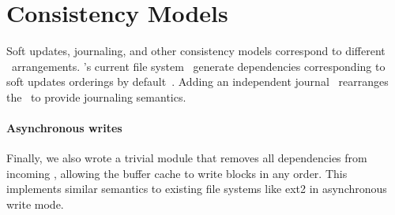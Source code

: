 \section{Consistency Models}
\label{sec:using}

Soft updates, journaling, and other consistency models
correspond to different \patch\ arrangements.
%
\Kudos's current file system \modules\ generate dependencies corresponding
to soft updates orderings by default~\cite{ganger00soft}.
%
Adding an independent journal \module\ rearranges the \patches\ to provide
journaling semantics.
%
%





\paragraph{Asynchronous writes}
\label{sec:modules:unlink}

Finally, we also wrote a trivial module that removes all dependencies from
incoming \patches, allowing the buffer cache to write blocks in any order.
%
This implements similar semantics to existing file systems like ext2 in
asynchronous write mode.


